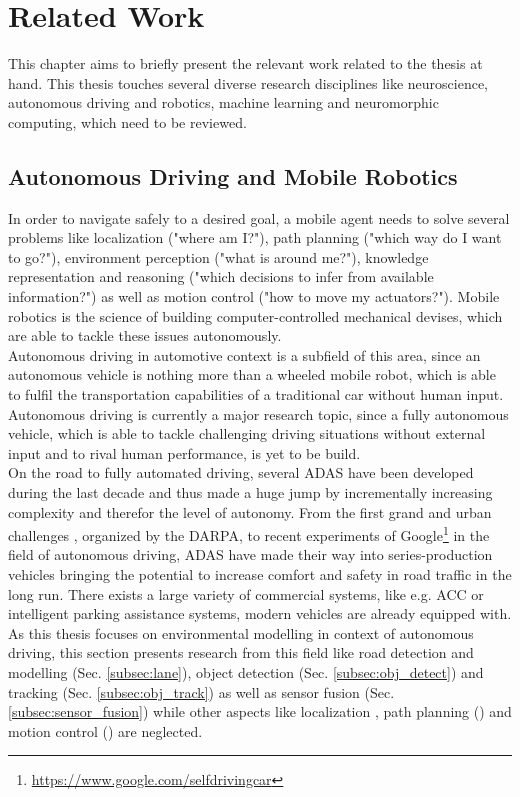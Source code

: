 \chapter{Related Work}
This chapter aims to briefly present the relevant work related to the thesis at hand.
This thesis touches several diverse research disciplines like neuroscience, autonomous driving and robotics, machine learning and neuromorphic computing, which need to be reviewed.

\section{Autonomous Driving and Mobile Robotics}
In order to navigate safely to a desired goal, a mobile agent needs to solve several problems like localization ("where am I?"), path planning ("which way do I want to go?"), environment perception ("what is around me?"), knowledge representation and reasoning ("which decisions to infer from available information?") as well as motion control ("how to move my actuators?").
Mobile robotics is the science of building computer-controlled mechanical devises, which are able to tackle these issues autonomously.\\
Autonomous driving in automotive context is a subfield of this area, since an autonomous vehicle is nothing more than a wheeled mobile robot, which is able to fulfil the transportation capabilities of a traditional car without human input. 
Autonomous driving is currently a major research topic, since a fully autonomous vehicle, which is able to tackle challenging driving situations without external input and to rival human performance, is yet to be build.\\
On the road to fully automated driving, several \ac{ADAS} have been developed during the last decade and thus made a huge jump by incrementally increasing complexity and therefor the level of autonomy. 
From the first grand \cite{Thrun2006} and urban challenges \cite{Urmson.2008}, organized by the \ac{DARPA}, to recent experiments of Google\footnote{\url{https://www.google.com/selfdrivingcar}} in the field of autonomous driving, \ac{ADAS} have made their way into series-production vehicles bringing the potential to increase comfort and safety in road traffic in the long run. 
There exists a large variety of commercial systems, like e.g. \ac{ACC} or intelligent parking assistance systems, modern vehicles are already equipped with.\\
As this thesis focuses on environmental modelling in context of autonomous driving, this section presents research from this field like road detection and modelling (Sec. \ref{subsec:lane}), object detection (Sec. \ref{subsec:obj_detect}) and tracking (Sec. \ref{subsec:obj_track}) as well as sensor fusion (Sec. \ref{subsec:sensor_fusion}) while other aspects like localization \cite{Levinson2010}, path planning () and motion control () are neglected.

